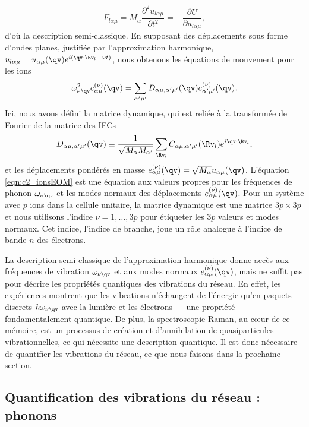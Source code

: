 \begin{equation}
    F_{l\alpha\mu}=M_\alpha \frac{\partial ^2 u_{l\alpha\mu}}{\partial t^2}=-\frac{\partial U}{\partial u_{l\alpha\mu}},
\end{equation}
d'où la description semi-classique. En supposant des déplacements sous forme d'ondes planes, justifiée par l'approximation harmonique, $u_{l\alpha\mu}=u_{\alpha\mu}(\qv)e^{i(\qv\cdot\Rv_l-\omega t)}$, nous obtenons les équations de mouvement pour les ions
\begin{equation}
    \omega_{\nu\qv}^2e_{\alpha\mu}^{(\nu)}(\qv)=\sum_{\alpha'\mu'}D_{\alpha\mu,\alpha'\mu'}(\qv)e_{\alpha'\mu'}^{(\nu)}(\qv).
    \label{eqn:c2_ionsEOM}
\end{equation}
Ici, nous avons défini la matrice dynamique, qui est reliée à la transformée de Fourier de la matrice des IFCs
\begin{equation}
    D_{\alpha\mu,\alpha'\mu'}(\qv)\equiv\frac{1}{\sqrt{M_\alpha M_{\alpha'}}}\sum_{\Rv_l}C_{\alpha\mu,\alpha'\mu'}(\Rv_l)e^{i\qv\cdot\Rv_l},
    \label{eqn:c2_D}
\end{equation}
et les déplacements pondérés en masse $e_{\alpha\mu}^{(\nu)}(\qv) = \sqrt{M_\alpha}u_{\alpha\mu}(\qv)$. L'équation \eqref{eqn:c2_ionsEOM} est une équation aux valeurs propres pour les fréquences de phonon $\omega_{\nu\qv}$ et les modes normaux des déplacements $e_{\alpha\mu}^{(\nu)}(\qv)$. Pour un système avec $p$ ions dans la cellule unitaire, la matrice dynamique est une matrice $3p\times 3p$ et nous utilisons l'indice $\nu=1,\dots,3p$ pour étiqueter les $3p$ valeurs et modes normaux. Cet indice, l'indice de branche, joue un rôle analogue à l'indice de bande $n$ des électrons.

La description semi-classique de l'approximation harmonique donne 
accès aux fréquences de vibration $\omega_{\nu\qv}$ et aux modes 
normaux $e_{\alpha\mu}^{(\nu)}(\qv)$, mais ne suffit pas pour 
décrire les propriétés quantiques des vibrations du réseau. En 
effet, les expériences montrent que les vibrations n'échangent 
de l'énergie qu'en paquets discrets $\hbar\omega_{\nu\qv}$ avec 
la lumière et les électrons --- une propriété fondamentalement 
quantique. De plus, la spectroscopie Raman, au cœur de ce 
mémoire, est un processus de création et d'annihilation de 
quasiparticules vibrationnelles, ce qui nécessite une description 
quantique. Il est donc nécessaire de quantifier les vibrations 
du réseau, ce que nous faisons dans la prochaine section.

\subsection{Quantification des vibrations du réseau : phonons}

